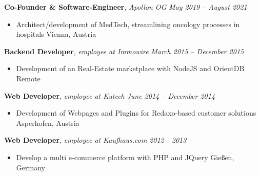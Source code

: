 \documentclass[9pt]{extarticle}
\begin{document}
\noindent
{\bf Co-Founder \& Software-Engineer}, \textit{Apollon OG}  \hfill \textit{May 2019 -- August 2021}
\begin{itemize}
\setlength\itemsep{0.05em}
\item Architect/development of MedTech, streamlining oncology processes in hospitals \hfill Vienna, Austria
\end{itemize}

\noindent
{\bf Backend Developer}, \textit{employee at Immowire}  \hfill \textit{March 2015 -- December 2015}
\begin{itemize}
\setlength\itemsep{0.05em}
\item Development of an Real-Estate marketplace with NodeJS and OrientDB \hfill Remote
\end{itemize}

\noindent
{\bf Web Developer}, \textit{employee at Kutech}  \hfill \textit{June 2014 -- December 2014}
\begin{itemize}
\setlength\itemsep{0.05em}
\item Development of Webpages and Plugins for Redaxo-based customer solutions \hfill Asperhofen, Austria
\end{itemize}

\noindent
{\bf Web Developer}, \textit{employee at Kaufhaus.com}  \hfill \textit{2012 - 2013}
\begin{itemize}
\setlength\itemsep{0.05em}
\item Develop a multi e-commerce platform with PHP and JQuery \hfill Gießen, Germany
\end{itemize}
\end{document}
